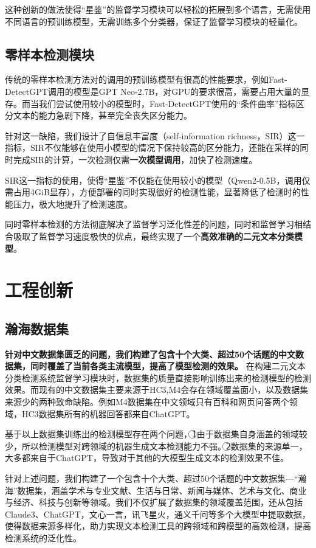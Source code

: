 \documentclass[a4paper]{report}
\begin{document}
这种创新的做法使得“星鉴”的监督学习模块可以轻松的拓展到多个语言，无需使用不同语言的预训练模型，无需训练多个分类器，保证了监督学习模块的轻量化。

\subsection{零样本检测模块}
传统的零样本检测方法对的调用的预训练模型有很高的性能要求，例如Fast-DetectGPT调用的模型是GPT Neo-2.7B，对GPU的要求很高，需要占用大量的显存。而当我们尝试使用较小的模型时，Fast-DetectGPT使用的“条件曲率”指标区分文本的能力急剧下降，甚至完全丧失区分能力。

针对这一缺陷，我们设计了自信息丰富度（self-information richness，SIR）这一指标，SIR不仅能够在使用小模型的情况下保持较高的区分能力，还能在采样的同时完成SIR的计算，一次检测仅需\textbf{一次模型调用}，加快了检测速度。

SIR这一指标的使用，使得“星鉴”不仅能在使用较小的模型（Qwen2-0.5B，调用仅需占用4GiB显存），方便部署的同时实现很好的检测性能，显著降低了检测时的性能压力，极大地提升了检测速度。

同时零样本检测的方法彻底解决了监督学习泛化性差的问题，同时和监督学习相结合吸取了监督学习速度极快的优点，最终实现了一个\textbf{高效准确的二元文本分类模型}。
\section{工程创新}
\subsection{瀚海数据集}
\textbf{针对中文数据集匮乏的问题，我们构建了包含十个大类、超过50个话题的中文数据集，同时覆盖了当前各类主流模型，提高了模型检测的效果。}
在构建二元文本分类检测系统监督学习模块时，数据集的质量直接影响训练出来的检测模型的检测效果。而现有的中文数据集主要来源于HC3,M4会存在领域覆盖面小，以及数据集来源少的两种致命缺陷。例如M4数据集在中文领域只有百科和网页问答两个领域，HC3数据集所有的机器回答都来自ChatGPT。

基于以上数据集训练出的检测模型存在两个问题，\textcircled{1}由于数据集自身涵盖的领域较少，所以检测模型对跨领域的机器生成文本检测能力不强。\textcircled{2}数据集的来源单一，大多都来自于ChatGPT，导致对于其他的大模型生成文本的检测效果不佳。

针对上述问题，我们构建了一个包含十个大类、超过50个话题的中文数据集---“瀚海”数据集，涵盖学术与专业文献、生活与日常、新闻与媒体、艺术与文化、商业与经济、科技与创新等领域。我们不仅扩展了数据集的领域覆盖范围，还从包括Claude3、ChatGPT，文心一言，讯飞星火，通义千问等多个大模型中提取数据，使得数据来源多样化，助力实现文本检测工具的跨领域和跨模型的高效检测，提高检测系统的泛化性。
\end{document}
